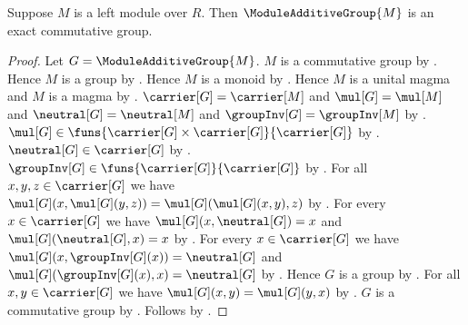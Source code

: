 \begin{proposition}\label{spike_module_additive_group_is_exact}
    Suppose $M$ is a left module over $R$.
    Then $\ModuleAdditiveGroup{M}$ is an exact commutative group.
\end{proposition}
\begin{proof}
    Let $G=\ModuleAdditiveGroup{M}$.
    $M$ is a commutative group by
        .
    Hence $M$ is a group by .
    Hence $M$ is a monoid by .
    Hence $M$ is a unital magma and $M$ is a magma by
        .
    $\carrier[G]=\carrier[M]$ and $\mul[G]=\mul[M]$ and
        $\neutral[G]=\neutral[M]$ and
        $\groupInv[G]=\groupInv[M]$ by
        .
    $\mul[G]\in\funs{\carrier[G]\times\carrier[G]}{\carrier[G]}$ by
        .
    $\neutral[G]\in\carrier[G]$ by .
    $\groupInv[G]\in\funs{\carrier[G]}{\carrier[G]}$ by
        .
    For all $x,y,z\in\carrier[G]$ we have
        $\mul[G](x,\mul[G](y,z))=\mul[G](\mul[G](x,y),z)$ by
        .
    For every $x\in\carrier[G]$ we have
        $\mul[G](x,\neutral[G])=x$ and
        $\mul[G](\neutral[G],x)=x$ by
        .
    For every $x\in\carrier[G]$ we have
        $\mul[G](x,\groupInv[G](x))=\neutral[G]$ and
        $\mul[G](\groupInv[G](x),x)=\neutral[G]$ by
        .
    Hence $G$ is a group by
        .
    For all $x,y\in\carrier[G]$ we have
        $\mul[G](x,y)=\mul[G](y,x)$ by
        .
    $G$ is a commutative group by
        .
    Follows by
        .
\end{proof}
